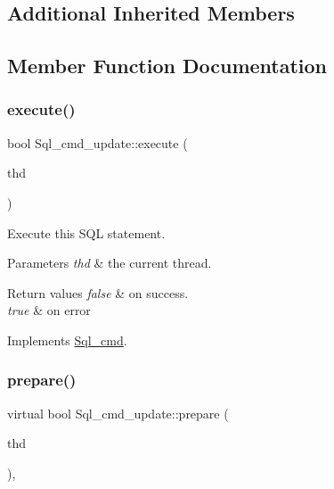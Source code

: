\subsection*{Additional Inherited Members}


\subsection{Member Function Documentation}
\mbox{\label{classSql__cmd__update_a948016f5dbbc804c7fcd5e0cf75364bc}} 
\subsubsection{\texorpdfstring{execute()}{execute()}}
{\footnotesize\ttfamily bool Sql\+\_\+cmd\+\_\+update\+::execute (\begin{DoxyParamCaption}\item[{T\+HD $\ast$}]{thd }\end{DoxyParamCaption})\hspace{0.3cm}{\ttfamily [virtual]}}

Execute this S\+QL statement. 
\begin{DoxyParams}{Parameters}
{\em thd} & the current thread. \\
\hline
\end{DoxyParams}

\begin{DoxyRetVals}{Return values}
{\em false} & on success. \\
\hline
{\em true} & on error \\
\hline
\end{DoxyRetVals}


Implements \mbox{\hyperlink{classSql__cmd_a213367b79b551296fbb7790f2a3732fb}{Sql\+\_\+cmd}}.

\mbox{\label{classSql__cmd__update_af3b765bea10980878c0d4c0e677ce88f}} 
\subsubsection{\texorpdfstring{prepare()}{prepare()}}
{\footnotesize\ttfamily virtual bool Sql\+\_\+cmd\+\_\+update\+::prepare (\begin{DoxyParamCaption}\item[{T\+HD $\ast$}]{thd }\end{DoxyParamCaption})\hspace{0.3cm}{\ttfamily [inline]}, {\ttfamily [virtual]}}


